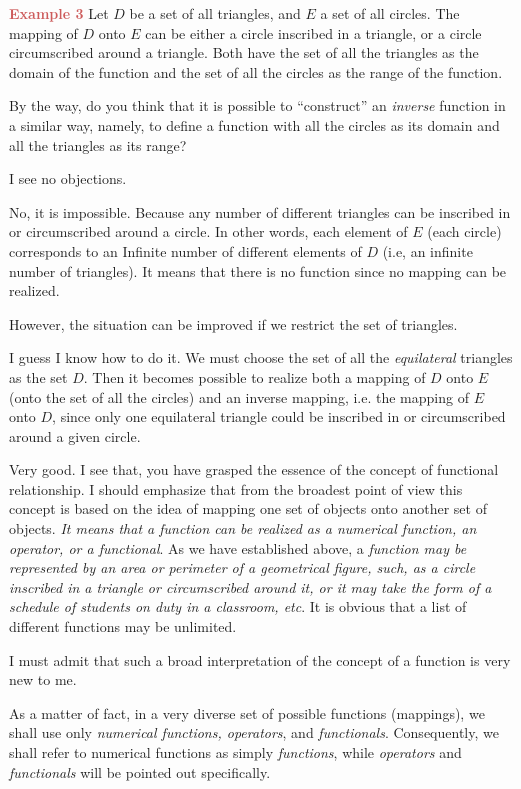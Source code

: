 {\textcolor{IndianRed}{\textbf{Example 3}} Let $D$ be a set of all triangles, and $E$ a set of all circles. The mapping of $D$ onto $E$ can be either a circle inscribed in a triangle, or a circle circumscribed around a triangle. Both have the set of all the triangles as the domain of the function and the set of all the circles as the range of the function.

By the way, do you think that it is possible to ``construct'' an \emph{inverse} function in a similar way, namely, to define a function with all the circles as its domain and all the triangles as its range?

\rdr I see no objections.

\athr No, it is impossible. Because any number of different triangles can be inscribed in or circumscribed around a circle. In other words, each element of $E$ (each circle) corresponds to an Infinite number of different elements of $D$ (i.e, an infinite number of triangles). It means that there is no function since no mapping can be realized.

However, the situation can be improved if we restrict the set of triangles.

\rdr I guess I know how to do it. We must choose the set of all the \emph{equilateral} triangles as the set $D$. Then it becomes possible to realize both a mapping of $D$ onto $E$ (onto the set of all the circles) and an inverse mapping, i.e. the mapping of $E$ onto $D$, since only one equilateral triangle could be inscribed in or circumscribed around a given circle.

\athr Very good. I see that, you have grasped the essence of the concept of functional relationship. I should emphasize that from the broadest point of view this concept is based on the idea of mapping one set of objects onto another set of objects. \emph{It means that a function can be realized as a numerical function, an operator, or a functional}. As we have established above, a \emph{function may be represented by an area or perimeter of a geometrical figure, such, as a circle inscribed in a triangle or circumscribed around it, or it may take the form of a schedule of students on duty in a classroom, etc}. It is obvious that a list of different functions may be unlimited.

\rdr I must admit that such a broad interpretation of the concept of a function is very new to me.

\athr As a matter of fact, in a very diverse set of possible functions (mappings), we shall use only \emph{numerical functions, operators}, and \emph{functionals}. Consequently, we shall refer to numerical functions as simply \emph{functions}, while \emph{operators} and \emph{functionals} will be pointed out specifically.

}
